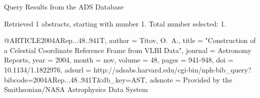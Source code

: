 Query Results from the ADS Database


Retrieved 1 abstracts, starting with number 1.  Total number selected: 1.

@ARTICLE{2004ARep...48..941T,
   author = {{Titov}, O.~A.},
    title = "{Construction of a Celestial Coordinate Reference Frame from VLBI Data}",
  journal = {Astronomy Reports},
     year = 2004,
    month = nov,
   volume = 48,
    pages = {941-948},
      doi = {10.1134/1.1822976},
   adsurl = {http://adsabs.harvard.edu/cgi-bin/nph-bib_query?bibcode=2004ARep...48..941T&db_key=AST},
  adsnote = {Provided by the Smithsonian/NASA Astrophysics Data System}
}


